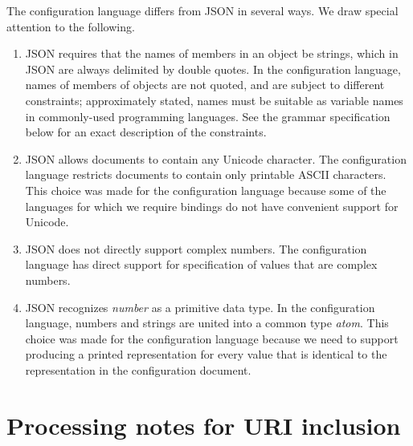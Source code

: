 \documentclass[twoside]{memarticle}
\begin{document}
The configuration language differs from JSON in several ways.
We draw special attention to the following.
\begin{enumerate}

\item JSON requires that the names of members in an object be strings,
which in JSON are always delimited by double quotes.
In the configuration language,
names of members of objects are not quoted,
and are subject to different constraints;
approximately stated,
names must be suitable as variable names
in commonly-used programming languages.
See the grammar specification below
for an exact description of the constraints.

\item JSON allows documents to contain any Unicode character.
The configuration language restricts documents 
to contain only printable ASCII characters.
This choice was made for the configuration language
because some of the languages for which we require bindings
do not have convenient support for Unicode.

\item JSON does not directly support complex numbers.
The configuration language has direct support 
for specification of values
that are complex numbers.

\item JSON recognizes \emph{number} as a primitive data type.
In the configuration language,
numbers and strings are united into a common type \emph{atom}.
This choice was made for the configuration language
because we need to support producing a printed representation
for every value
that is identical to the representation in the configuration document.
\end{enumerate}

\chapter{Processing notes for URI inclusion}
\end{document}
